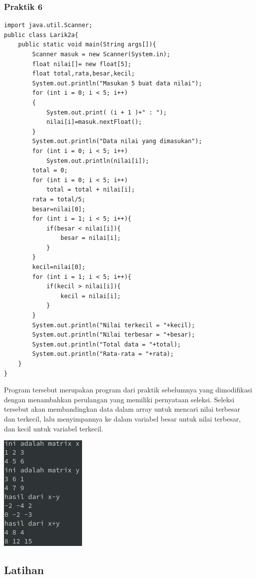 \documentclass[a4paper,12pt]{article}
\begin{document}
\subsubsection{Praktik 6}
\begin{lstlisting}
import java.util.Scanner;
public class Larik2a{
    public static void main(String args[]){
        Scanner masuk = new Scanner(System.in);
        float nilai[]= new float[5];
        float total,rata,besar,kecil;
        System.out.println("Masukan 5 buat data nilai");
        for (int i = 0; i < 5; i++)
        {
            System.out.print( (i + 1 )+" : ");
            nilai[i]=masuk.nextFloat();
        }
        System.out.println("Data nilai yang dimasukan");
        for (int i = 0; i < 5; i++)
            System.out.println(nilai[i]);
        total = 0;
        for (int i = 0; i < 5; i++)
            total = total + nilai[i];
        rata = total/5;
        besar=nilai[0];
        for (int i = 1; i < 5; i++){
            if(besar < nilai[i]){
                besar = nilai[i];
            }
        }
        kecil=nilai[0];
        for (int i = 1; i < 5; i++){
            if(kecil > nilai[i]){
                kecil = nilai[i];
            }
        }
        System.out.println("Nilai terkecil = "+kecil);
        System.out.println("Nilai terbesar = "+besar);
        System.out.println("Total data = "+total);
        System.out.println("Rata-rata = "+rata);
    }
}
\end{lstlisting}
Program tersebut merupakan program dari praktik sebelumnya yang dimodifikasi dengan menambahkan perulangan yang memiliki pernyataan seleksi. Seleksi tersebut akan membandingkan data dalam 
array untuk mencari nilai terbesar dan terkecil, lalu menyimpannya ke dalam variabel besar untuk nilai terbesar, dan kecil untuk variabel terkecil.
\begin{center}
    \includegraphics[scale=.7]{5.png}
\end{center}

\subsection{Latihan}
\end{document}
